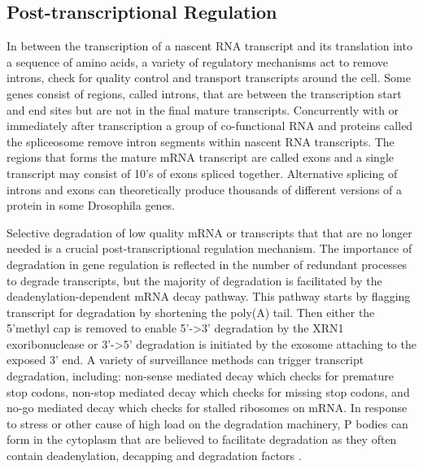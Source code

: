 \documentclass[../main.tex]{subfiles}
\begin{document}
\subsection{Post-transcriptional Regulation}

In between the transcription of a nascent RNA transcript and its translation into a sequence of amino acids, a variety of regulatory mechanisms act to remove introns, check for quality control and transport transcripts around the cell.
Some genes consist of regions, called introns, that are between the transcription start and end sites but are not in the final mature transcripts.
Concurrently with or immediately after transcription a group of co-functional RNA and proteins called the spliceosome remove intron segments within nascent RNA transcripts.
The regions that forms the mature mRNA transcript are called exons and a single transcript may consist of 10's of exons spliced together.
Alternative splicing of introns and exons can theoretically produce thousands of different versions of a protein in some Drosophila genes.

Selective degradation of low quality mRNA or transcripts that that are no longer needed is a crucial post-transcriptional regulation mechanism.
The importance of degradation in gene regulation is reflected in the number of redundant processes to degrade transcripts, but the majority of degradation is facilitated by the deadenylation-dependent mRNA decay pathway.
This pathway starts by flagging transcript for degradation by shortening  the poly(A) tail.
Then either the 5'methyl cap is removed to enable 5'->3' degradation by the XRN1 exoribonuclease or 3'->5' degradation is initiated by the exosome attaching to the exposed 3' end. 
A variety of surveillance methods can trigger transcript degradation, including: non-sense mediated decay which checks for premature stop codons, non-stop mediated decay which checks for missing stop codons, and no-go mediated decay which checks for stalled ribosomes on mRNA.
In response to stress or other cause of high load on the degradation machinery, P bodies can form in the cytoplasm that are believed to facilitate degradation as they often contain deadenylation, decapping and degradation factors \parencite{Garneau2007}.
\end{document}
